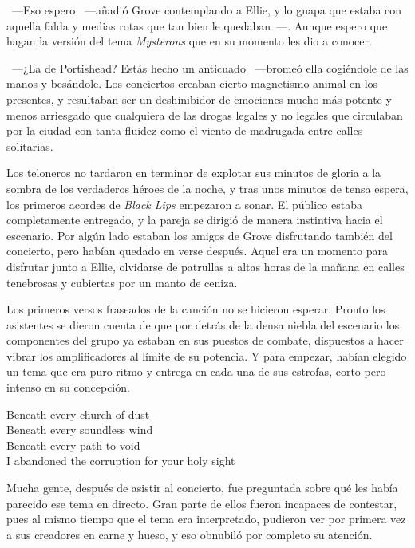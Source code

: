 ~---Eso espero ~---añadió Grove contemplando a Ellie, y lo guapa que estaba con aquella falda y medias rotas que tan bien le quedaban~---. Aunque espero que hagan la versión del tema \emph{Mysterons} que en su momento les dio a conocer.

~---¿La de Portishead? Estás hecho un anticuado ~---bromeó ella cogiéndole de las manos y besándole. Los conciertos creaban cierto magnetismo animal en los presentes, y resultaban ser un deshinibidor de emociones mucho más potente y menos arriesgado que cualquiera de las drogas legales y no legales que circulaban por la ciudad con tanta fluidez como el viento de madrugada entre calles solitarias.

Los teloneros no tardaron en terminar de explotar sus minutos de gloria a la sombra de los verdaderos héroes de la noche, y tras unos minutos de tensa espera, los primeros acordes de \emph{Black Lips} empezaron a sonar. El público estaba completamente entregado, y la pareja se dirigió de manera instintiva hacia el escenario. Por algún lado estaban los amigos de Grove disfrutando también del concierto, pero habían quedado en verse después. Aquel era un momento para disfrutar junto a Ellie, olvidarse de patrullas a altas horas de la mañana en calles tenebrosas y cubiertas por un manto de ceniza.

Los primeros versos fraseados de la canción no se hicieron esperar. Pronto los asistentes se dieron cuenta de que por detrás de la densa niebla del escenario los componentes del grupo ya estaban en sus puestos de combate, dispuestos a hacer vibrar los amplificadores al límite de su potencia. Y para empezar, habían elegido un tema que era puro ritmo y entrega en cada una de sus estrofas, corto pero intenso en su concepción.

\begin{center}
    \begin{em}
        Beneath every church of dust\\
        Beneath every soundless wind\\
        Beneath every path to void\\
        I abandoned the corruption for your holy sight
    \end{em}
\end{center}

Mucha gente, después de asistir al concierto, fue preguntada sobre qué les había parecido ese tema en directo. Gran parte de ellos fueron incapaces de contestar, pues al mismo tiempo que el tema era interpretado, pudieron ver por primera vez a sus creadores en carne y hueso, y eso obnubiló por completo su atención.


